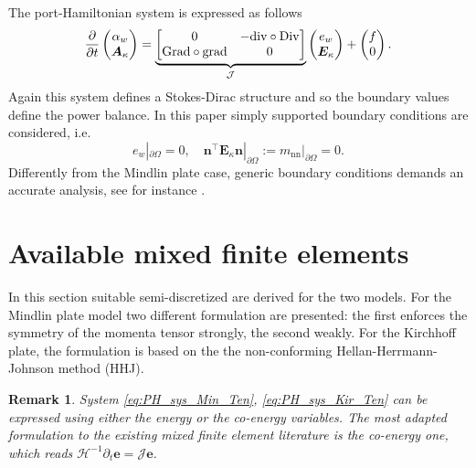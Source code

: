 \documentclass{ifacconf}
\newtheorem{remark}{Remark}
\begin{document}
The port-Hamiltonian system is expressed as follows 
\begin{equation}
\label{eq:PH_sys_Kir_Ten}
\diffp{}{t}
\begin{pmatrix}
\alpha_w \\
\bm{A}_\kappa \\
\end{pmatrix} = 
\underbrace{\begin{bmatrix}
	0  & -\mathrm{div} \circ \mathrm{Div} \\
	\mathrm{Grad} \circ \mathrm{grad}  & 0 \\
	\end{bmatrix}}_{\mathcal{J}}
\begin{pmatrix}
e_w \\
\bm{E}_{\kappa} \\
\end{pmatrix}+ 
\begin{pmatrix}
f \\
0 \\
\end{pmatrix}.
\end{equation}
Again this system defines a Stokes-Dirac structure and so the boundary values define the power balance. In this paper simply supported boundary conditions are considered, i.e.
\[
e_w|_{\partial \Omega} = 0, \quad \bm{n}^\top \bm{E}_\kappa \bm{n}|_{\partial \Omega}:= m_{\text{nn}}|_{\partial \Omega} = 0.
\]
Differently from the Mindlin plate case, generic boundary conditions demands an accurate analysis, see for instance \cite{Blum1990,mixed_kirchhoff}.

\section{Available mixed finite elements}
\label{sec:mixed}

In this section suitable semi-discretized are derived for the two models. For the Mindlin plate model two different formulation are presented: the first enforces the symmetry of the momenta tensor strongly, the second weakly. For the Kirchhoff plate, the formulation is based on the the non-conforming Hellan-Herrmann-Johnson method (HHJ). 

\begin{remark}
System \eqref{eq:PH_sys_Min_Ten}, \eqref{eq:PH_sys_Kir_Ten} can be expressed using either the energy or the co-energy variables. The  most adapted formulation to the existing mixed finite element literature is the co-energy one, which reads $\mathcal{H}^{-1} \partial_t \bm{e} = \mathcal{J} \bm{e}$.
\end{remark}
\end{document}
